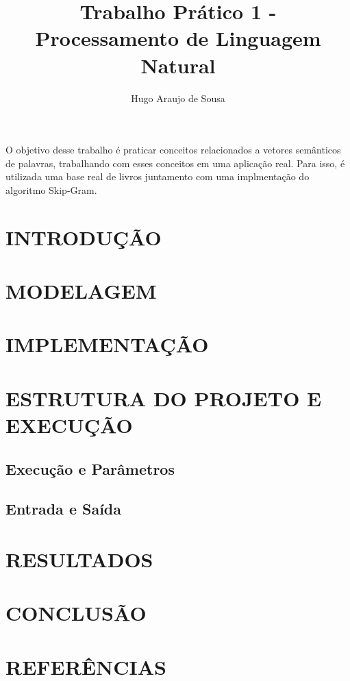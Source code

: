 \documentclass[12pt]{article}
\title{Trabalho Prático 1 - Processamento de Linguagem Natural}
\author{Hugo Araujo de Sousa}
\begin{document}
 

\maketitle
     
\begin{resumo} 
  O objetivo desse trabalho é praticar conceitos relacionados a vetores semânticos
  de palavras, trabalhando com esses conceitos em uma aplicação real. Para isso,
  é utilizada uma base real de livros juntamento com uma implmentação do algoritmo
  Skip-Gram.
\end{resumo}

\section{INTRODUÇÃO}


\section{MODELAGEM}


\section{IMPLEMENTAÇÃO}


\section{ESTRUTURA DO PROJETO E EXECUÇÃO}

\subsection{Execução e Parâmetros}


\subsection{Entrada e Saída}


\section{RESULTADOS}


\section{CONCLUSÃO}

\section{REFERÊNCIAS}



\end{document}
